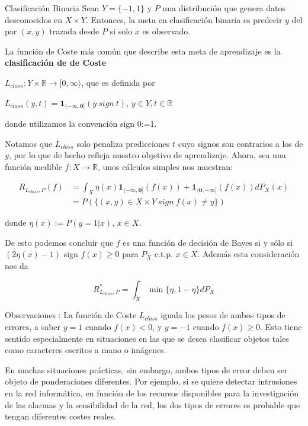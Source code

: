 \documentclass[utf8,spanish,xcolor={table,dvipsnames},12pt]{beamer}
\begin{document}
\begin{frame}{Clasificación Binaria}
Sean $Y=\{-1,1\}$ y $P$ una distribución que genera datos desconocidos en $X\times Y$. Entonces, la meta en clasificación binaria es predecir $y$ del par $(x,y)$ trazada desde $P$ si solo $x$ es observado.

\vspace{0.3cm}


La función de  Coste más común que describe esta meta de aprendizaje es la \textbf{clasificación de de Coste}

\vspace{0.2cm}

 $L_{class}: Y\times \mathds{R} \rightarrow [0,\infty\rangle$, que es definida por
\begin{center}
  $L_{class}(y,t)=\boldsymbol{1_{\langle -\infty, 0]}}(y \ sign \ t)$, \hspace{1cm} $y\in Y, t\in \mathds{R}$
\end{center}
donde utilizamos la convención sign 0:=1.
\end{frame}


\begin{frame}
Notamos que $L_{class}$ solo penaliza predicciones $t$ cuyo signos son contrarios a los de $y$, por lo que de hecho refleja nuestro objetivo de aprendizaje. Ahora, sea una función medible $f: X\rightarrow \mathds{R}$, unos cálculos simples nos muestran:

\begin{align*}
    R_{L_{class},P}(f) & =\int_{X} \eta(x)\boldsymbol{1_{\langle -\infty, 0]}}(f(x))+\boldsymbol{1_{\langle 0, -\infty]}}(f(x))dP_{X}(x)\\
     & = P(\{(x,y)\in X\times Y \ sign \ f(x)\neq y \})
\end{align*}

donde $\eta(x):= P(y = 1|x)$, $x\in X$.
\end{frame}


\begin{frame}
De esto podemos concluir que $f$ es una función de decisión de Bayes si y sólo si $(2\eta(x)-1)$ sign $f(x)\geq0$ para $P_{X}$ c.t.p. $x\in X$. Además esta consideración nos da

$$R^{\ast}_{L_{class},P}=\int_{X} \min\{\eta, 1-\eta\}dP_{X}$$
\end{frame}


\begin{frame}{Observaciones :}
La función de Coste $L_{class}$ iguala los pesos de ambos tipos de errores, a saber $y=1$ cuando $f(x)<0$, y $y=-1$ cuando $f(x)\geq0$. Esto tiene sentido especialmente en situaciones en las que se desea clasificar objetos tales como caracteres escritos a mano o imágenes.

\vspace{0.2cm}

 En muchas situaciones prácticas, sin embargo, ambos tipos de error deben ser objeto de ponderaciones diferentes. Por ejemplo, si se quiere detectar intrusiones en la red informática, en función de los recursos disponibles para la investigación de las alarmas y la sensibilidad de la red, los dos tipos de errores es probable que tengan diferentes costes reales.
\end{frame}
\end{document}

